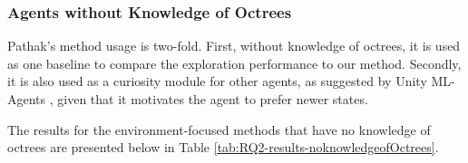 \newpage
\subsubsection{Agents without Knowledge of Octrees}

Pathak's method \cite{pathak2017curiosity} usage is two-fold. First, without knowledge of octrees, it is used as one baseline to compare the exploration performance to our method. Secondly, it is also used as a curiosity module for other agents, as suggested by Unity ML-Agents \cite{github-unity-mlagents-toolkit}, given that it motivates the agent to prefer newer states.



The results for the environment-focused methods that have no knowledge of octrees are presented below in Table \ref{tab:RQ2-results-noknowledgeofOctrees}.
